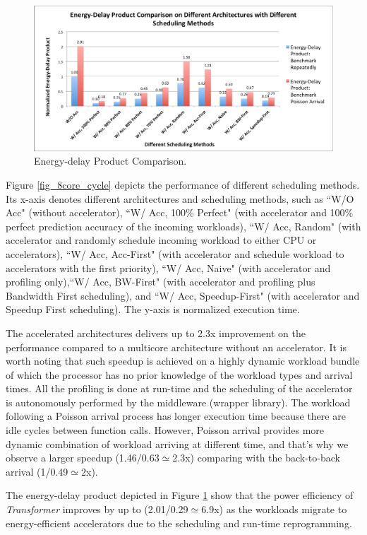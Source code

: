 \begin{figure}
    \centering
    \includegraphics[width=4.5in]{Energy-Delay-8core}
    \caption{Energy-delay Product Comparison.}
    \label{fig_8core_energy_delay}
\end{figure}

Figure \ref{fig_8core_cycle} depicts the performance of different
scheduling methods. Its x-axis denotes different
architectures and scheduling methods, such as ``W/O Acc" (without
accelerator), ``W/ Acc, 100\% Perfect" (with accelerator and 100\%
perfect prediction accuracy of the incoming workloads), ``W/ Acc,
Random" (with accelerator and randomly schedule incoming workload to
either CPU or accelerators), ``W/ Acc, Acc-First" (with accelerator
and schedule workload to accelerators with the first priority), ``W/
Acc, Naive" (with accelerator and profiling only),``W/ Acc, BW-First"
(with accelerator and profiling plus Bandwidth First scheduling), and
``W/ Acc, Speedup-First" (with accelerator and Speedup First
scheduling). The y-axis is normalized execution time.

The accelerated architectures delivers up to 2.3x improvement on the performance
compared to a multicore architecture without an accelerator. It is
worth noting that such speedup is achieved on a highly dynamic
workload bundle of which the processor has no prior knowledge of the
workload types and arrival times. All the profiling is done at run-time and the
scheduling of the accelerator is autonomously performed by the
middleware (wrapper library). The workload following a Poisson arrival
process has longer execution time because there are idle cycles
between function calls. However, Poisson arrival provides more dynamic
combination of workload arriving at different time, and that's why we
observe a larger speedup (1.46/0.63$\simeq$2.3x) comparing with the
back-to-back arrival (1/0.49$\simeq$2x). 

The energy-delay product depicted in Figure
\ref{fig_8core_energy_delay} show that the power efficiency of {\em
 Transformer} improves by up to (2.01/0.29$\simeq$6.9x) as the workloads migrate to
energy-efficient accelerators due to the scheduling and run-time
reprogramming.



